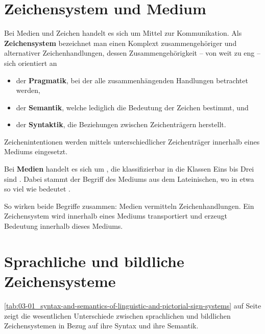 \section{Zeichensystem und Medium}
\label{sec:03-01_sign-system-and-medium}

Bei Medien und Zeichen handelt es sich um Mittel zur Kommunikation. Als \textbf{Zeichensystem} bezeichnet man einen Komplext zusammengehöriger und alternativer Zeichenhandlungen, dessen Zusammengehörigkeit -- von weit zu eng -- sich orientiert an

\begin{itemize}
    \item der \textbf{Pragmatik}, bei der alle zusammenhängenden Handlungen betrachtet werden,
    \item der \textbf{Semantik}, welche lediglich die Bedeutung der Zeichen bestimmt, und
    \item der \textbf{Syntaktik}, die Beziehungen zwischen Zeichenträgern herstellt.
\end{itemize}

Zeichenintentionen werden mittels unterschiedlicher Zeichenträger innerhalb eines Mediums eingesetzt. \cite[S. 18 f.]{001_MKO02_media-as-means-of-communication}

Bei \textbf{Medien} handelt es sich um , die klassifizierbar in die Klassen Eins bis Drei sind \cite[S. 7 f.]{001_MKO02_media-as-means-of-communication}. Dabei stammt der Begriff des Mediums aus dem Lateinischen, wo  in etwa so viel wie  bedeutet \cite[S. 6]{001_MKO02_media-as-means-of-communication}.

So wirken beide Begriffe zusammen: Medien vermitteln Zeichenhandlungen. Ein Zeichensystem wird innerhalb eines Mediums transportiert und erzeugt Bedeutung innerhalb dieses Mediums.

\section{Sprachliche und bildliche Zeichensysteme}
\label{sec:03-02_linguistic-and-pictorial-sign-systems}

\autoref{tab:03-01_syntax-and-semantics-of-linguistic-and-pictorial-sign-systems} auf Seite \pageref{tab:03-01_syntax-and-semantics-of-linguistic-and-pictorial-sign-systems} zeigt die wesentlichen Unterschiede zwischen sprachlichen und bildlichen Zeichensystemen in Bezug auf ihre Syntax und ihre Semantik.

